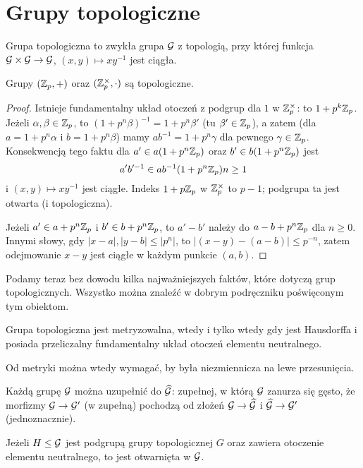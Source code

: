 \section{Grupy topologiczne}
Grupa topologiczna to zwykła grupa $\mathcal G$ z topologią, przy której funkcja $\mathcal G \times \mathcal G \to \mathcal G$, $(x,y) \mapsto xy^{-1}$ jest ciągła.

\begin{fakt}
	Grupy $(\mathbb Z_p, +)$ oraz $(\mathbb Z_p^\times, \cdot)$ są topologiczne.
\end{fakt}

\begin{proof}
	Istnieje fundamentalny układ otoczeń z podgrup dla $1$ w $\mathbb Z_p^\times$: to $1 + p^k \mathbb Z_p$.
	Jeżeli $\alpha, \beta \in \mathbb Z_p$, to $(1+p^n\beta)^{-1} = 1 + p^n \beta'$ (tu $\beta' \in \mathbb Z_p$), a zatem (dla $a = 1 + p^n \alpha$ i $b = 1 + p^n \beta$) mamy $ab^{-1} = 1 + p^n \gamma$ dla pewnego $\gamma \in \mathbb Z_p$.
	Konsekwencją tego faktu dla $a' \in a(1+p^n\mathbb Z_p)$ oraz $b' \in b(1+p^n\mathbb Z_p)$ jest
	\[
		a'b'^{-1} \in ab^{-1}(1+p^n\Z_p) \hfill n \ge 1
	\]
	i $(x,y) \mapsto xy^{-1}$ jest ciągłe.
	Indeks $1+p\mathbb Z_p$ w $\mathbb Z_p^\times$ to $p-1$; podgrupa ta jest otwarta (i topologiczna).

	Jeżeli $a' \in a + p^n \mathbb Z_p$ i $b' \in b + p^n \mathbb Z_p$, to $a' - b'$ należy do $a-b + p^n\mathbb Z_p$ dla $n \ge 0$.
	Innymi słowy, gdy $|x-a|,|y-b| \le |p^n|$, to $|(x-y)-(a-b)| \le p^{-n}$, zatem odejmowanie $x - y$ jest ciągłe w każdym punkcie $(a,b)$.
\end{proof}

Podamy teraz bez dowodu kilka najważniejszych faktów, które dotyczą grup topologicznych.
Wszystko można znaleźć w dobrym podręczniku poświęconym tym obiektom.

\begin{fakt}
	Grupa topologiczna jest metryzowalna, wtedy i tylko wtedy gdy jest Hausdorffa i posiada przeliczalny fundamentalny układ otoczeń elementu neutralnego.
\end{fakt}

Od metryki można wtedy wymagać, by była niezmiennicza na lewe przesunięcia.

Każdą grupę $\mathcal G$ można uzupełnić do $\widehat {\mathcal G}$: zupełnej, w którą $\mathcal G$ zanurza się gęsto, że morfizmy $\mathcal G \to \mathcal G'$ (w zupełną) pochodzą od złożeń $\mathcal G \to \widehat {\mathcal G}$ i $\widehat {\mathcal G} \to \mathcal G'$ (jednoznacznie).

\begin{fakt}
	Jeżeli $H \le \mathcal G$ jest podgrupą grupy topologicznej $G$ oraz zawiera otoczenie elementu neutralnego, to jest otwarnięta w $\mathcal G$.
\end{fakt}

